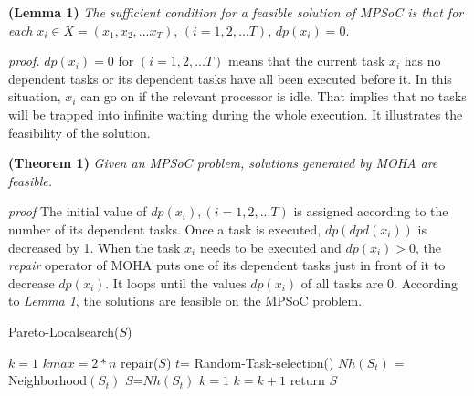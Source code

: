 \textbf{(Lemma 1) } \textit{The sufficient condition for a feasible solution of MPSoC is that for each} $ x_i \in X=(x_1,x_2,...x_T)$, $ (i=1,2,...T)$, $ dp(x_i)=0$.

\textit{proof.}
$ dp(x_i)=0 $ for $ (i=1,2,...T)$  means that the current task $x_i$ has no dependent tasks or its dependent tasks have all been executed before it. In this situation, $x_i$ can go on if the relevant processor is idle. That implies that no tasks will be trapped into infinite waiting during the whole execution. It illustrates the feasibility of the solution.

\textbf{(Theorem 1) } \textit{Given an MPSoC problem, solutions generated by MOHA are feasible. }

\textit{proof}
The initial value of $ dp(x_i),(i=1,2,...T)$ is assigned according to the number of its dependent tasks. Once a task is executed, $ dp(dpd(x_i)) $ is decreased by 1. When the task $ x_i$ needs to be executed and $dp(x_i)>0$, the \textit{repair} operator of MOHA puts one of its dependent tasks just in front of it to decrease $dp(x_i)$. It loops until the values $dp(x_i)$ of all tasks are 0. According to \textit{Lemma 1}, the solutions are feasible on the MPSoC problem.


\begin{algorithm}
\caption{Pareto-Localsearch($S$)}
\label{alg3}
\begin{algorithmic} [1]
\State $k=1$
\State $kmax=2*n$
\State repair($ S $)
\State $t$= Random-Task-selection()
\State $ Nh(S_t) $ = Neighborhood$(S_t)$
\State $S$=$Nh(S_t)$
\State $k=1$
\Else
\State $k=k+1$
\EndIf
\EndWhile
\State return $S$
\end{algorithmic}
\end{algorithm}
